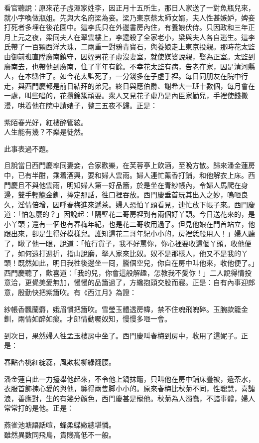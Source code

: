 看官聽說：原來花子虛渾家姓李，因正月十五所生，那日人家送了一對魚瓶兒來，就小字喚做瓶姐。先與大名府梁為妾。梁乃東京蔡太師女婿，夫人性甚嫉妒，婢妾打死者多埋在後花園中。這李氏只在外邊書房內住，有養娘伏侍。只因政和三年正月上元之夜，梁同夫人在翠雲樓上，李逵殺了全家老小，{}梁與夫人各自逃生。這李氏帶了一百顆西洋大珠，{}二兩重一對鴉青寶石，與養娘走上東京投親。那時花太監由御前班直陞廣南鎮守，因姪男花子虛沒妻室，就使媒婆說親，娶為正室。太監到廣南去，也帶他到廣南，住了半年有餘。不幸花太監有病，告老在家，因是清河縣人，在本縣住了。如今花太監死了，一分錢多在子虛手裡。每日同朋友在院中行走，與西門慶都是前日結拜的弟兄。終日與應伯爵、謝希大一班十數個，每月會在一處，叫些唱的，花攢錦簇頑耍。衆人又見花子虛乃是內臣家勤兒，手裡使錢撒漫，哄着他在院中請婊子，整三五夜不歸。正是：

\begin{myquote}
紫陌春光好，紅樓醉管絃。\\人生能有幾？不樂是徒然。
\end{myquote}

此事表過不題。

且說當日西門慶率同妻妾，合家歡樂，在芙蓉亭上飲酒，至晚方散。歸來潘金蓮房中，已有半酣，乘着酒興，要和婦人雲雨。婦人連忙薰香打鋪，和他解衣上床。西門慶且不與他雲雨，明知婦人第一好品簫，於是坐在青紗帳內，令婦人馬爬在身邊，雙手輕籠金釧，捧定那話，徃口裡吞放。西門慶垂首玩其出入之妙，嗚咂良久，淫情倍增，因呼春梅進來遞茶。{}婦人恐怕丫頭看見，連忙放下帳子來。西門慶道：「怕怎麼的？」因說起：「隔壁花二哥房裡到有兩個好丫頭。今日送花來的，是小丫頭；還有一個也有春梅年紀，也是花二哥收用過了。但見他娘在門首站立，{}他跟出來，卻是生得好模樣兒。誰知這花二哥年紀小小的，房裡恁般用人！」{}婦人聽了，瞅了他一眼，說道：「恠行貨子，我不好罵你，你心裡要收這個丫頭，{}收他便了，如何遠打週折，指山說磨，拏人家來比奴。奴不是那樣人，他又不是我的丫頭！既然如此，明日我徃後邊坐一囘，騰個空兒，你自在房中叫他來，收他便了。」{}西門慶聽了，歡喜道：「我的兒，你會這般解趣，怎教我不愛你！」二人說得情投意洽，更覺美愛無加，慢慢的品簫過了，方纔抱頭交股而寢。正是：自有內事迎郎意，殷勤快把紫簫吹。有《西江月》為證：

\begin{myquote}
紗帳香飄蘭麝，娥眉慣把簫吹。雪瑩玉體透房幃，禁不住魂飛魄碎。玉腕款籠金釧，兩情如醉如癡。才郎情動囑奴知，慢慢多咂一會。
\end{myquote}

到次日，果然婦人徃孟玉樓房中坐了。西門慶叫春梅到房中，收用了這妮子。正是：

\begin{myquote}
春點杏桃紅綻蕊，風欺楊柳綠翻腰。
\end{myquote}

潘金蓮自此一力擡舉他起來，不令他上鍋抹竈，只叫他在房中鋪床疊被，遞茶水，衣服首飾揀心愛的與他，纏得兩隻脚小小的。原來春梅比秋菊不同，性聰慧，喜謔浪，善應對，生的有幾分顏色，西門慶甚是寵他。秋菊為人濁蠢，不諳事體，婦人常常打的是他。正是：

\begin{myquote}
燕雀池塘語話喧，蜂柔蝶嫩總堪憐。\\雖然異數同飛鳥，貴賤高低不一般。
\end{myquote}

